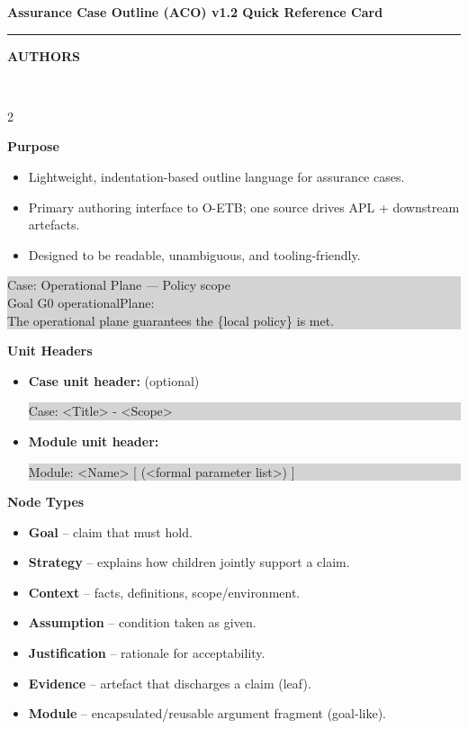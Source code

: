 \documentclass[10pt,letterpaper]{article}
\newcommand{\CardTitle}[1]{%
  \begin{center}
    {\Large\bfseries #1}\\[-2pt]
    \rule{0.92\linewidth}{0.6pt}
  \end{center}
}
\newcommand{\BannerBox}[1]{%
  \noindent\colorbox{Banner}{%
    \parbox{\linewidth}{\color{white}\bfseries\small\hspace{6pt}#1\hspace{6pt}}%
  }\\[10pt]
}
\newcommand{\Sec}[1]{%
  \vspace{5pt}%
  \noindent{\color{RuleGray}\rule{\linewidth}{0.35pt}}\par
  \vspace{2pt}%
  {\bfseries #1}\par
  \vspace{2pt}%
}
\newcommand{\Example}[1]{%
  \vspace{1pt}%
  \noindent\colorbox{LightGray}{%
    \parbox{\linewidth}{\ttfamily\footnotesize\raggedright
#1
    }%
  }%
  \vspace{2pt}%
}
\begin{document}
\CardTitle{Assurance Case Outline (ACO) v1.2 Quick Reference Card}
\BannerBox{AUTHORS}

\begin{multicols*}{2}
\raggedcolumns

\Sec{Purpose}
\begin{itemize}
  \item Lightweight, indentation-based outline language for assurance cases.
  \item Primary authoring interface to O-ETB; one source drives APL + downstream artefacts.
  \item Designed to be readable, unambiguous, and tooling-friendly.
\end{itemize}
\Example{Case: Operational Plane --- Policy scope\\
Goal G0 operationalPlane:\\
\hspace*{1.5em}The operational plane guarantees the \{local policy\} is met.}

\Sec{Unit Headers}
\begin{itemize}
  \item \textbf{Case unit header:} (optional)\\
  \Example{Case: <Title> - <Scope>}          
  \item \textbf{Module unit header:}\\
  \Example{Module: <Name> [ (<formal parameter list>) ]}
\end{itemize}
\vspace{-12pt}

\Sec{Node Types}
\begin{itemize}
  \item \textbf{Goal} -- claim that must hold.
  \item \textbf{Strategy} -- explains how children jointly support a claim.
  \item \textbf{Context} -- facts, definitions, scope/environment.
  \item \textbf{Assumption} -- condition taken as given.
  \item \textbf{Justification} -- rationale for acceptability.
  \item \textbf{Evidence} -- artefact that discharges a claim (leaf).
  \item \textbf{Module} -- encapsulated/reusable argument fragment (goal-like).
\end{itemize}
\vspace{-6pt}


\end{multicols*}
\end{document}
